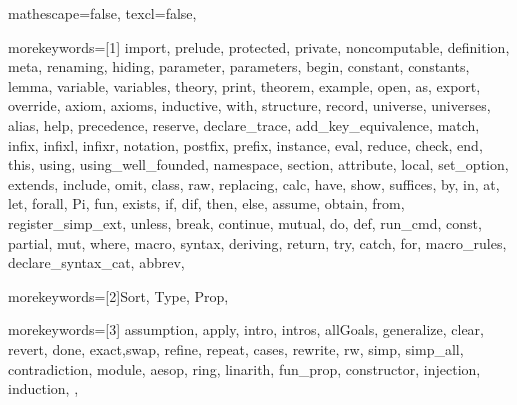 
 {

mathescape=false,
texcl=false,

morekeywords=[1]{
import, prelude, protected, private, noncomputable, definition, meta, renaming,
hiding, parameter, parameters, begin, constant, constants,
lemma, variable, variables, theory,
print, theorem, example,
open, as, export, override, axiom, axioms, inductive, with,
structure, record, universe, universes,
alias, help, precedence, reserve, declare_trace, add_key_equivalence,
match, infix, infixl, infixr, notation, postfix, prefix, instance,
eval, reduce, check, end, this,
using, using_well_founded, namespace, section,
attribute, local, set_option, extends, include, omit, class,
raw, replacing,
calc, have, show, suffices, by, in, at, let, forall, Pi, fun,
exists, if, dif, then, else, assume, obtain, from, register_simp_ext, unless, break, continue,
mutual, do, def, run_cmd, const,
partial, mut, where, macro, syntax, deriving,
return, try, catch, for, macro_rules, declare_syntax_cat, abbrev},

morekeywords=[2]{Sort, Type, Prop},

morekeywords=[3]{
assumption,
apply, intro, intros, allGoals,
generalize, clear, revert, done, exact,swap,
refine, repeat, cases, rewrite, rw,
simp, simp_all, contradiction, module, aesop, ring, linarith, fun_prop,
constructor, injection,
induction,
},


}
